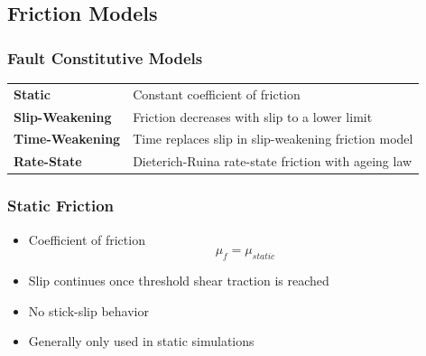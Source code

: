 \documentclass{beamer}
\begin{document}
\subsection{Friction Models}

\begin{frame}
  \frametitle{Fault Constitutive Models}

  \begin{tabular}{lp{3in}}
    {\bf\color{green} Static} & Constant coefficient of friction \\
    {\bf\color{green} Slip-Weakening} & Friction decreases with slip to a
    lower limit \\
    {\bf\color{green} Time-Weakening} & Time replaces slip in slip-weakening
    friction model \\
    {\bf\color{green} Rate-State} & Dieterich-Ruina rate-state friction with
    ageing law 
  \end{tabular}
  
\end{frame}


\begin{frame}
  \frametitle{Static Friction}

  \begin{itemize}
  \item Coefficient of friction
    \begin{equation}
      \mu_f = \mu_\mathit{static}
    \end{equation}
  \item Slip continues once threshold shear traction is reached
  \item No stick-slip behavior
  \item Generally only used in static simulations
  \end{itemize}
  
\end{frame}
\end{document}
